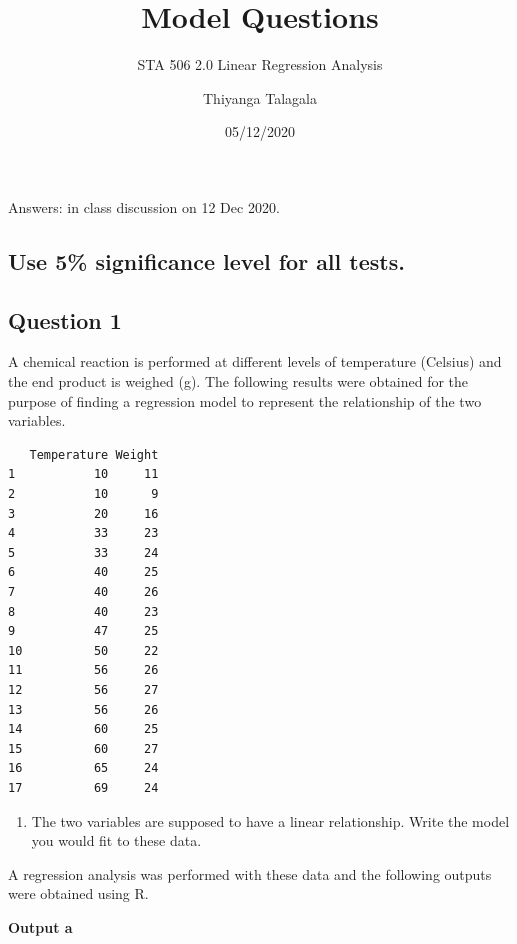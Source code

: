 \documentclass[]{article}
\title{Model Questions}
\subtitle{STA 506 2.0 Linear Regression Analysis}
\author{Thiyanga Talagala}
\date{05/12/2020}
\providecommand{\tightlist}{%
  \setlength{\itemsep}{0pt}\setlength{\parskip}{0pt}}
\begin{document}
\maketitle

Answers: in class discussion on 12 Dec 2020.

\hypertarget{use-5-significance-level-for-all-tests.}{%
\subsection{Use 5\% significance level for all
tests.}\label{use-5-significance-level-for-all-tests.}}

\hypertarget{question-1}{%
\subsection{Question 1}\label{question-1}}

A chemical reaction is performed at different levels of temperature
(Celsius) and the end product is weighed (g). The following results were
obtained for the purpose of finding a regression model to represent the
relationship of the two variables.

\begin{verbatim}
   Temperature Weight
1           10     11
2           10      9
3           20     16
4           33     23
5           33     24
6           40     25
7           40     26
8           40     23
9           47     25
10          50     22
11          56     26
12          56     27
13          56     26
14          60     25
15          60     27
16          65     24
17          69     24
\end{verbatim}

\begin{enumerate}
\def\labelenumi{\roman{enumi})}
\tightlist
\item
  The two variables are supposed to have a linear relationship. Write
  the model you would fit to these data.
\end{enumerate}

\newpage

A regression analysis was performed with these data and the following
outputs were obtained using R.

\textbf{Output a}
\end{document}
